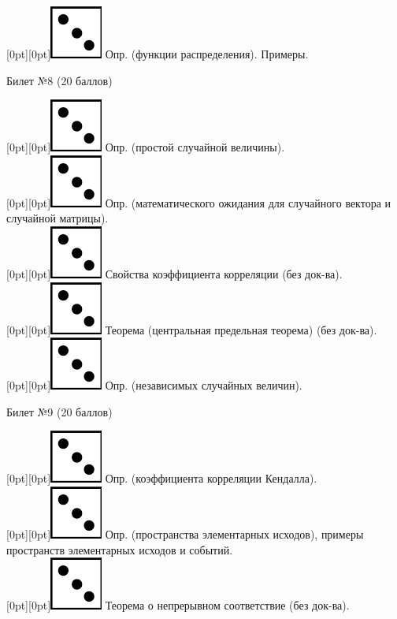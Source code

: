 \documentclass[preview]{standalone}
\begin{document}
\raisebox{-1pt}[0pt][0pt]{\includegraphics[width=0.02\linewidth]{3.png}} Опр. (функции распределения). Примеры. \\
\begin{center} {\Large Билет №8 (20 баллов)} \end{center}
\raisebox{-1pt}[0pt][0pt]{\includegraphics[width=0.02\linewidth]{3.png}} Опр. (простой случайной величины). \\
\raisebox{-1pt}[0pt][0pt]{\includegraphics[width=0.02\linewidth]{3.png}} Опр. (математического ожидания для случайного вектора и случайной матрицы). \\
\raisebox{-1pt}[0pt][0pt]{\includegraphics[width=0.02\linewidth]{3.png}} Свойства коэффициента корреляции (без док-ва). \\
\raisebox{-1pt}[0pt][0pt]{\includegraphics[width=0.02\linewidth]{3.png}} Теорема (центральная предельная теорема) (без док-ва). \\
\raisebox{-1pt}[0pt][0pt]{\includegraphics[width=0.02\linewidth]{3.png}} Опр. (независимых случайных величин). \\
\begin{center} {\Large Билет №9 (20 баллов)} \end{center}
\raisebox{-1pt}[0pt][0pt]{\includegraphics[width=0.02\linewidth]{3.png}} Опр. (коэффициента корреляции Кендалла). \\
\raisebox{-1pt}[0pt][0pt]{\includegraphics[width=0.02\linewidth]{3.png}} Опр. (пространства элементарных исходов), примеры пространств элементарных исходов и событий. \\
\raisebox{-1pt}[0pt][0pt]{\includegraphics[width=0.02\linewidth]{3.png}} Теорема о непрерывном соответствие (без док-ва). \\
\end{document}
